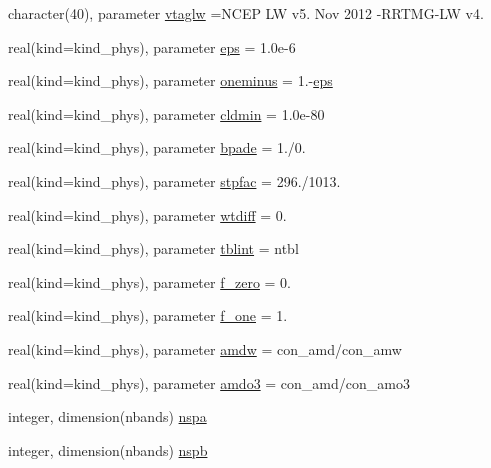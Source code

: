 \begin{DoxyCompactItemize}
\item 
character(40), parameter \hyperlink{namespacemodule__radlw__main_a8d63a28d2550f8e193619e46a4c47d70}{vtaglw} =\textquotesingle{}N\+C\+EP LW v5. Nov 2012 -\/R\+R\+T\+MG-\/LW v4. \textquotesingle{}
\item 
real(kind=kind\+\_\+phys), parameter \hyperlink{namespacemodule__radlw__main_ac82309fd8d0e351ac37b276833a10376}{eps} = 1.\+0e-\/6
\item 
real(kind=kind\+\_\+phys), parameter \hyperlink{namespacemodule__radlw__main_a8c35a92c2a08663ce04bdf9de8717247}{oneminus} = 1.-\/\hyperlink{namespacemodule__radlw__main_ac82309fd8d0e351ac37b276833a10376}{eps}
\item 
real(kind=kind\+\_\+phys), parameter \hyperlink{namespacemodule__radlw__main_ac55ad4a1ff397794e054be6647bafb73}{cldmin} = 1.\+0e-\/80
\item 
real(kind=kind\+\_\+phys), parameter \hyperlink{namespacemodule__radlw__main_a5c63b9836ad5735dd3d0811ff527c41c}{bpade} = 1./0.
\item 
real(kind=kind\+\_\+phys), parameter \hyperlink{namespacemodule__radlw__main_a483b88df2bdada7ef349d9530f91b762}{stpfac} = 296./1013.
\item 
real(kind=kind\+\_\+phys), parameter \hyperlink{namespacemodule__radlw__main_af1a0ca36bfce779493a7d1a4b81f6f73}{wtdiff} = 0.
\item 
real(kind=kind\+\_\+phys), parameter \hyperlink{namespacemodule__radlw__main_af6b84954042db7b1e2a6abdb4d401ccf}{tblint} = ntbl
\item 
real(kind=kind\+\_\+phys), parameter \hyperlink{namespacemodule__radlw__main_a9b8f65236249b31c8f9fcf1cfd0e7baa}{f\+\_\+zero} = 0.
\item 
real(kind=kind\+\_\+phys), parameter \hyperlink{namespacemodule__radlw__main_a518605a1451822f1888c6c7e85e07328}{f\+\_\+one} = 1.
\item 
real(kind=kind\+\_\+phys), parameter \hyperlink{namespacemodule__radlw__main_a9845c3a6eaa014e6a310fe1436162e37}{amdw} = con\+\_\+amd/con\+\_\+amw
\item 
real(kind=kind\+\_\+phys), parameter \hyperlink{namespacemodule__radlw__main_a06f62c34722a3d7dcec9b5643d78f039}{amdo3} = con\+\_\+amd/con\+\_\+amo3
\item 
integer, dimension(nbands) \hyperlink{namespacemodule__radlw__main_a42bbf62b5d91586f17d352af74e3c032}{nspa}
\item 
integer, dimension(nbands) \hyperlink{namespacemodule__radlw__main_a520be8a7f308d9e2c8e88b185170404e}{nspb}

\end{DoxyCompactItemize}
